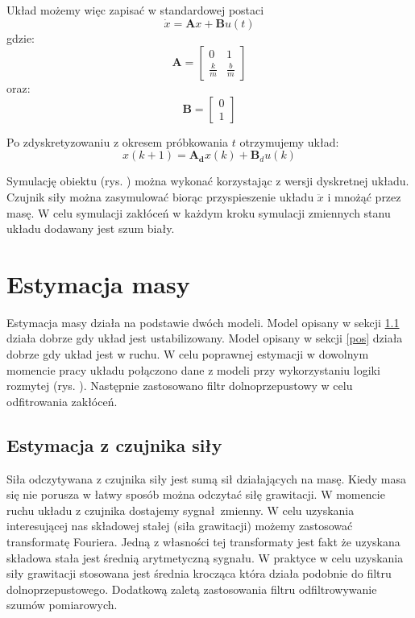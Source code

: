 \documentclass[a4paper]{article}
\begin{document}
Układ możemy więc zapisać w standardowej postaci
\begin{equation}
\dot{x} = \textbf{A}x + \textbf{B}u(t)
\end{equation}
gdzie:
\begin{equation}
\mathbf{A} = 	\begin{bmatrix}
	    0 & 1 \\
	    \frac{k}{m} & \frac{b}{m}
	\end{bmatrix}
\end{equation}
oraz:
\begin{equation}
\mathbf{B} = \begin{bmatrix}
	    0 \\
	    1
	\end{bmatrix}
\end{equation}

Po zdyskretyzowaniu z okresem próbkowania $t$ otrzymujemy układ:
\begin{equation}
x(k+1) = \mathbf{A_d}x(k) + \mathbf{B}_du(k)
\label{eq:dyskretny}
\end{equation}


Symulację obiektu (rys. ) można wykonać korzystając z wersji dyskretnej układu. Czujnik siły można zasymulować biorąc przyspieszenie układu $\ddot{x}$ i mnożąć przez masę. W celu symulacji zakłóceń w każdym kroku symulacji zmiennych stanu układu dodawany jest szum biały.

\section{Estymacja masy}
Estymacja masy działa na podstawie dwóch modeli. Model opisany w sekcji \ref{fs} działa dobrze gdy układ jest ustabilizowany. Model opisany w sekcji \ref{pos} działa dobrze gdy układ jest w ruchu. W celu poprawnej estymacji w dowolnym momencie pracy układu połączono dane z modeli przy wykorzystaniu logiki rozmytej (rys. ). Następnie zastosowano filtr dolnoprzepustowy w celu odfitrowania zakłóceń.
  
\subsection{Estymacja z czujnika siły}
\label{fs}
Siła odczytywana z czujnika siły jest sumą sił działających na masę. Kiedy masa się nie porusza w łatwy sposób można odczytać siłę grawitacji. W momencie ruchu układu z czujnika dostajemy sygnał zmienny. W celu uzyskania interesującej nas składowej stałej (siła grawitacji) możemy zastosować transformatę Fouriera. Jedną z własności tej transformaty jest fakt że uzyskana składowa stała jest średnią arytmetyczną sygnału. W praktyce w celu uzyskania siły grawitacji stosowana jest średnia krocząca która działa podobnie do filtru dolnoprzepustowego. Dodatkową zaletą zastosowania filtru odfiltrowywanie szumów pomiarowych.
\end{document}
